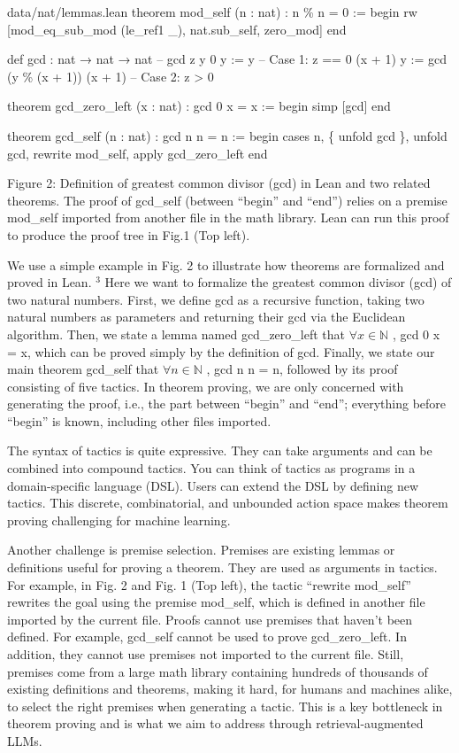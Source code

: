 \documentclass[
]{article}
\begin{document}
data/nat/lemmas.lean theorem mod\_self (n : nat) : n \% n = 0 := begin
rw {[}mod\_eq\_sub\_mod (le\_ref1 \_), nat.sub\_self, zero\_mod{]} end

def gcd : nat → nat → nat -- gcd z y \textbar{} 0 y := y -- Case 1: z ==
0 \textbar{} (x + 1) y := gcd (y \% (x + 1)) (x + 1) -- Case 2: z
\textgreater{} 0

theorem gcd\_zero\_left (x : nat) : gcd 0 x = x := begin simp {[}gcd{]}
end

theorem gcd\_self (n : nat) : gcd n n = n := begin cases n, \{ unfold
gcd \}, unfold gcd, rewrite mod\_self, apply gcd\_zero\_left end

Figure 2: Definition of greatest common divisor (gcd) in Lean and two
related theorems. The proof of gcd\_self (between ``begin'' and ``end'')
relies on a premise mod\_self imported from another file in the math
library. Lean can run this proof to produce the proof tree in Fig.1 (Top
left).

We use a simple example in Fig. 2 to illustrate how theorems are
formalized and proved in Lean. \(^{3}\) Here we want to formalize the
greatest common divisor (gcd) of two natural numbers. First, we define
gcd as a recursive function, taking two natural numbers as parameters
and returning their gcd via the Euclidean algorithm. Then, we state a
lemma named gcd\_zero\_left that \(\forall x \in \mathbb{N}\) , gcd 0 x
= x, which can be proved simply by the definition of gcd. Finally, we
state our main theorem gcd\_self that \(\forall n \in \mathbb{N}\) , gcd
n n = n, followed by its proof consisting of five tactics. In theorem
proving, we are only concerned with generating the proof, i.e., the part
between ``begin'' and ``end''; everything before ``begin'' is known,
including other files imported.

The syntax of tactics is quite expressive. They can take arguments and
can be combined into compound tactics. You can think of tactics as
programs in a domain-specific language (DSL). Users can extend the DSL
by defining new tactics. This discrete, combinatorial, and unbounded
action space makes theorem proving challenging for machine learning.

Another challenge is premise selection. Premises are existing lemmas or
definitions useful for proving a theorem. They are used as arguments in
tactics. For example, in Fig. 2 and Fig. 1 (Top left), the tactic
``rewrite mod\_self'' rewrites the goal using the premise mod\_self,
which is defined in another file imported by the current file. Proofs
cannot use premises that haven't been defined. For example, gcd\_self
cannot be used to prove gcd\_zero\_left. In addition, they cannot use
premises not imported to the current file. Still, premises come from a
large math library containing hundreds of thousands of existing
definitions and theorems, making it hard, for humans and machines alike,
to select the right premises when generating a tactic. This is a key
bottleneck in theorem proving and is what we aim to address through
retrieval-augmented LLMs.
\end{document}

